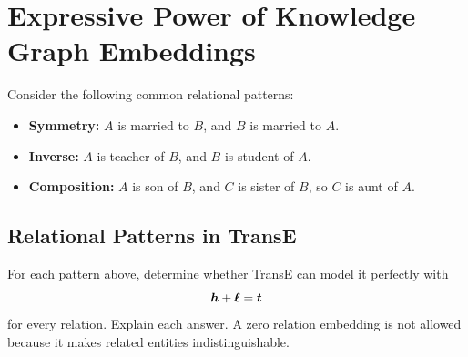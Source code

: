 \clearpage
\section{Expressive Power of Knowledge Graph Embeddings}

Consider the following common relational patterns:
\begin{itemize}
  \item \textbf{Symmetry:} \(A\) is married to \(B\), and \(B\) is married to
    \(A\).
  \item \textbf{Inverse:} \(A\) is teacher of \(B\), and \(B\) is student of
    \(A\).
  \item \textbf{Composition:} \(A\) is son of \(B\), and \(C\) is sister of
    \(B\), so \(C\) is aunt of \(A\).
\end{itemize}

\subsection{Relational Patterns in TransE}

For each pattern above, determine whether TransE can model it perfectly with
\[
  \bm{h}+\bm{\ell}=\bm{t}
\]
for every relation. Explain each answer. A zero relation embedding is not
allowed because it makes related entities indistinguishable.

